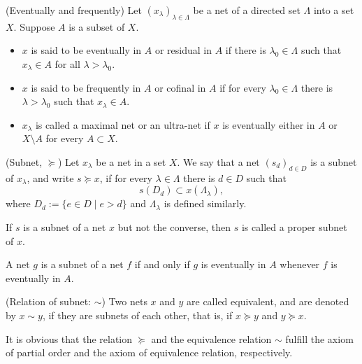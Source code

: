 \documentclass{report}
\begin{document}
\begin{dfn} (Eventually and frequently)
    Let \( (x_{\lambda})_{\lambda \in \Lambda} \) be a net of a directed set \( \Lambda \) into a set \( X \). Suppose \( A \) is a subset of \( X \).
    \begin{itemize}
        \item \( x \) is said to be eventually in \( A \) or residual in \( A \) if there is \( \lambda_0 \in \Lambda \) such that \( x_{\lambda} \in A\) for all \( \lambda >\lambda_0 \).
        \item \( x \) is said to be frequently in \( A \) or cofinal in \( A \) if for every \( \lambda_0 \in \Lambda \) there is \( \lambda > \lambda_0\) such that \( x_{\lambda} \in A\).
        \item \( x_{\lambda} \) is called a maximal net or an ultra-net if \( x \) is eventually either in \( A \) or \( X \setminus A \) for every \( A \subset X \).
    \end{itemize}
\end{dfn}


\begin{dfn} (Subnet, \( \succeq \))
    Let \( x_{\lambda} \) be a net in a set \( X \). We say that a net \( \left( s_d \right)_{d \in D} \) is a subnet of \( x_{\lambda} \), and write \( s \succeq x \), if for every \( \lambda \in \Lambda \) there is \( d \in D \) such that
    \begin{equation*}
        s(D_d) \subset x(\Lambda_{\lambda}),
    \end{equation*}
    where \( D_d:=\{ e \in D \mid e >d \} \) and \( \Lambda_{\lambda} \) is defined similarly.

    If \( s \) is a subnet of a net \( x \) but not the converse, then \( s \) is called a proper subnet of \( x \).
\end{dfn}

\begin{lem}\label{characterize subnet}
    A net \( g \) is a subnet of a net \( f \) if and only if \( g \) is eventually in \( A \) whenever \( f \) is eventually in \( A \).
\end{lem}

\begin{dfn} (Relation of subnet: \( \sim \))
    Two nets \( x \) and \( y \) are called equivalent, and are denoted by \( x \sim y \), if they are subnets of each other, that is, if \( x \succeq y \) and \( y \succeq x \).
\end{dfn}

\begin{rem}
    It is obvious that the relation \( \succeq \) and the equivalence relation \( \sim \) fulfill the axiom of partial order and the axiom of equivalence relation, respectively.
\end{rem}
\end{document}
